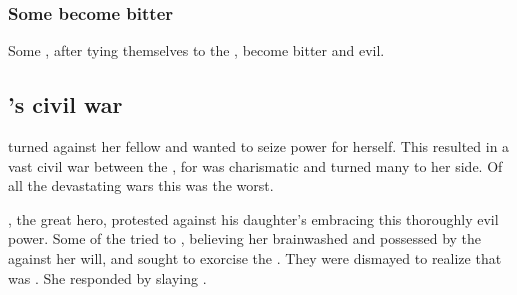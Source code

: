\subsubsection{Some \dragons become bitter}
Some \dragons, after tying themselves to the \xss, become bitter and evil. 










\subsection[Tyrasshana's civil war]{\Tiamat's civil war}
\Tiamat turned against her fellow \dragons and wanted to seize power for herself.
This resulted in a vast civil war between the \dragons, for \Tiamat was charismatic and turned many \dragons to her side.
Of all the devastating \dragon wars this was the worst. 

\HesodNerga{}, the great \ophidian{} hero, protested against his daughter's embracing this thoroughly evil power. 
Some of the \ophidians{} tried to  \Tiamat, believing her brainwashed and possessed by the \xzaishanns{} against her will, and sought to exorcise the \daemons. 
They were dismayed to realize that \Tiamat{} was . 
She responded by slaying \HesodNerga. 








